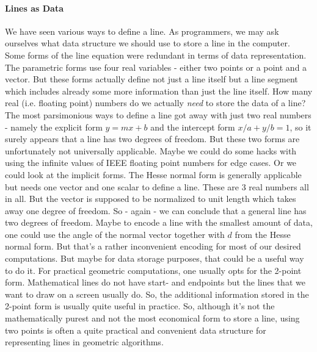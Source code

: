 \paragraph{Lines as Data}
We have seen various ways to define a line. As programmers, we may ask ourselves what data structure we should use to store a line in the computer. Some forms of the line equation were redundant in terms of data representation. The parametric forms use four real variables - either two points or a point and a vector. But these forms actually define not just a line itself but a line segment which includes already some more information than just the line itself. How many real (i.e. floating point) numbers do we actually \emph{need} to store the data of a line? The most parsimonious ways to define a line got away with just two real numbers - namely the explicit form $y = mx + b$ and the intercept form $x/a + y/b = 1$, so it surely appears that a line has two degrees of freedom. But these two forms are unfortunately not universally applicable. Maybe we could do some hacks with using the infinite values of IEEE floating point numbers for edge cases. Or we could look at the implicit forms. The Hesse normal form is generally applicable but needs one vector and one scalar to define a line. These are 3 real numbers all in all. But the vector is supposed to be normalized to unit length which takes away one degree of freedom. So - again - we can conclude that a general line has two degrees of freedom. Maybe to encode a line with the smallest amount of data, one could use the angle of the normal vector together with $d$ from the Hesse normal form. But that's a rather inconvenient encoding for most of our desired computations. But maybe for data storage purposes, that could be a useful way to do it. For practical geometric computations, one usually opts for the 2-point form. Mathematical lines do not have start- and endpoints but the lines that we want to draw on a screen usually do. So, the additional information stored in the 2-point form is usually quite useful in practice. So, although it's not the mathematically purest and not the most economical form to store a line, using two points is often a quite practical and convenient data structure for representing lines in geometric algorithms.


